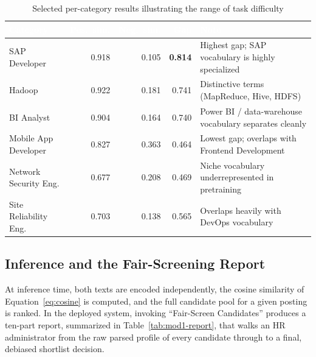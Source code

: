\documentclass[11pt,a4paper]{article}
\newcommand{\hdrow}{\rowcolor{TPnavy}}
\newcommand{\hdtxt}[1]{\textcolor{white}{\bfseries #1}}
\begin{document}
\begin{table}[H]
\centering
\caption{Selected per-category results illustrating the range of task difficulty}
\label{tab:mod1-percategory}
\small
\begin{tabular}{p{3.4cm}rrrp{4.6cm}}
\toprule
\hdrow \hdtxt{Category} & \hdtxt{Pos.\ sim.} & \hdtxt{Neg.\ sim.} & \hdtxt{Gap} & \hdtxt{Note} \\
\midrule
SAP Developer & 0.918 & 0.105 & \textbf{0.814} & Highest gap; SAP vocabulary is highly specialized \\
\rowcolor{TPlight}
Hadoop & 0.922 & 0.181 & 0.741 & Distinctive terms (MapReduce, Hive, HDFS) \\
BI Analyst & 0.904 & 0.164 & 0.740 & Power BI / data-warehouse vocabulary separates cleanly \\
\rowcolor{TPlight}
Mobile App Developer & 0.827 & 0.363 & 0.464 & Lowest gap; overlaps with Frontend Development \\
Network Security Eng. & 0.677 & 0.208 & 0.469 & Niche vocabulary underrepresented in pretraining \\
\rowcolor{TPlight}
Site Reliability Eng. & 0.703 & 0.138 & 0.565 & Overlaps heavily with DevOps vocabulary \\
\bottomrule
\end{tabular}
\end{table}

\subsection{Inference and the Fair-Screening Report}
\label{sec:mod1-inference}

At inference time, both texts are encoded independently, the cosine similarity of Equation~\ref{eq:cosine} is computed, and the full candidate pool for a given posting is ranked. In the deployed system, invoking ``Fair-Screen Candidates'' produces a ten-part report, summarized in Table~\ref{tab:mod1-report}, that walks an HR administrator from the raw parsed profile of every candidate through to a final, debiased shortlist decision.
\end{document}
